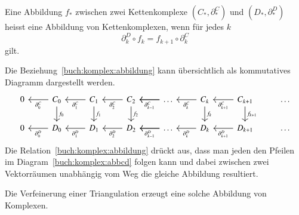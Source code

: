 \begin{definition}
Eine Abbildung $f_*$ zwischen zwei Kettenkomplexe $(C_*,\partial^C_*)$ und 
$(D_*,\partial^D_*)$ heisst eine Abbildung von Kettenkomplexen, wenn
für jedes $k$ 
\begin{equation}
\partial^D_k
\circ
f_{k}
=
f_{k+1}
\circ
\partial^C_k
\label{buch:komplex:abbildung}
\end{equation}
gilt.
\end{definition}

Die Beziehung~\eqref{buch:komplex:abbildung} kann übersichtlich als
kommutatives Diagramm dargestellt werden.
\begin{equation}
\begin{tikzcd}
0 
	& C_0 \arrow[l, "\partial_0^C"]
		\arrow[d, "f_0"]
		& C_1 \arrow[l,"\partial_1^C"]
			\arrow[d, "f_1"]
			& C_2 \arrow[l,"\partial_2^C"]
				\arrow[d, "f_2"]
				& \dots \arrow[l]
					\arrow[l, "\partial_{k-1}^C"]
					& C_k
						\arrow[l, "\partial_k^C"]
						\arrow[d, "f_k"]
						& C_{k+1}\arrow[l, "\partial_{k+1}^C"]
							\arrow[d, "f_{k+1}"]
							& \dots
\\
0 
	& D_0 \arrow[l, "\partial_0^D"]
		& D_1 \arrow[l,"\partial_1^D"]
			& D_2 \arrow[l,"\partial_2^D"]
				& \dots \arrow[l]
					\arrow[l, "\partial_{k-1}^D"]
					& D_k
						\arrow[l, "\partial_k^D"]
						& D_{k+1}\arrow[l, "\partial_{k+1}^D"]
							& \dots
\end{tikzcd}
\label{buch:komplex:abbcd}
\end{equation}
Die Relation~\eqref{buch:komplex:abbildung} drückt aus, dass man jeden
den Pfeilen im Diagram~\eqref{buch:komplex:abbcd} folgen kann und
dabei zwischen zwei Vektorräumen unabhängig vom Weg die gleiche Abbildung
resultiert.

Die Verfeinerung einer Triangulation erzeugt eine solche Abbildung von
Komplexen.



